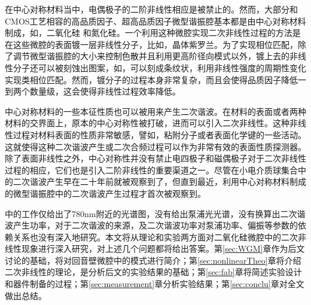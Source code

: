 	在中心对称材料当中，电偶极子的二阶非线性相应是被禁止的\cite{boyd2003nonlinear}。然而，大部分和CMOS工艺相容的高品质因子、超高品质因子微型谐振腔基本都是由中心对称材料制成，如，二氧化硅\cite{armani2003ultra, kippenberg2003fabrication}	和氮化硅\cite{levy2011harmonic}。一个利用这种微腔实现二次非线性过程的方法是在这些微腔的表面镀一层非线性分子\cite{xu2008second}，比如，晶体紫罗兰\cite{dominguez2011whispering}。为了实现相位匹配，除了调节微型谐振腔的大小来控制色散并且利用更高阶径向模式以外，镀上去的非线性分子还可以被刻蚀出图案，如，可以刻成条纹状，利用非线性强度的周期性变化实现类相位匹配\cite{dominguez2011whispering}。然而，镀分子的过程本身非常复杂，而且会使得品质因子降低一到两个数量级\cite{xu2008second}，这会使得非线性过程效率降低。
	
中心对称材料的一些本征性质也可以被用来产生二次谐波。在材料的表面或者两种材料的交界面上，原本的中心对称性被打破，进而可以引入二次非线性\cite{heinz1991second}。这种非线性过程对材料表面的性质非常敏感，譬如，粘附分子或者表面化学键的一些活动。这就使得这种二次谐波产生或二次合频过程可以作为非常有效的表面性质探测器\cite{shen1989surface, shank1983femtosecond, heinz1985study, tom1986investigation}。除了表面非线性之外，中心对称性并没有禁止电四极子和磁偶极子对于二次非线性过程的相应\cite{heinz1991second}，它们也是引入二阶非线性的重要渠道之一。尽管在小电介质球集合中的二次谐波产生早在二十年前就被观察到了\cite{martorell1997scattering, maymo2006visible, shan2006experimental}，但直到最近，利用中心对称材料制成的微型谐振腔中的二次谐波产生过程才首次被观察到\cite{asano2016visible}。
	
\cite{asano2016visible}中的工作仅给出了780nm附近的光谱图，没有给出泵浦光光谱，没有换算出二次谐波产生功率，对于二次谐波的来源，及二次谐波功率对泵浦功率、偏振等参数的依赖关系也没有深入地研究。本文将从理论和实验两方面对二氧化硅微腔中的二次非线性现象进行深入研究，对上述几个问题都将给出答案。第\ref{sec:WGM}章作为后文讨论的基础，将对回音壁微腔中的模式进行简介；第\ref{sec:nonlinearTheo}章将介绍二次非线性的理论，是分析后文的实验结果的基础；第\ref{sec:fab}章将简述实验设计和器件制备的过程；第\ref{sec:measurement}章分析实验结果；第\ref{sec:conclu}章对全文做出总结。
